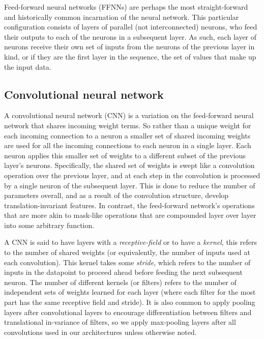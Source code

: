 \documentclass[utf8]{frontiersSCNS} %
\begin{document}
Feed-forward neural networks (FFNNs) are perhaps the most straight-forward and historically common incarnation of the neural network. This particular configuration consists of layers of parallel (not interconnected) neurons, who feed their outputs to each of the neurons in a subsequent layer. As such, each layer of neurons receive their own set of inputs from the neurons of the previous layer in kind, or if they are the first layer in the sequence, the set of values that make up the input data. 

\subsection{Convolutional neural network}

A convolutional neural network (CNN) \cite{GoodfellowTextbook, LeCun2015} is a variation on the feed-forward neural network that shares incoming weight terms. So rather than a unique weight for each incoming connection to a neuron a smaller set of shared incoming weights are used for all the incoming connections to each neuron in a single layer. Each neuron applies this smaller set of weights to a different subset of the previous layer's neurons. Specifically, the shared set of weights is swept like a convolution operation over the previous layer, and at each step in the convolution is processed by a single neuron of the subsequent layer. This is done to reduce the number of parameters overall, and as a result of the convolution structure, develop translation-invariant features. In contrast, the feed-forward network's operations that are more akin to mask-like operations that are compounded layer over layer into some arbitrary function.

A CNN is said to have layers with a {\em receptive-field} or to have a {\em kernel}, this refers to the number of shared weights (or equivalently, the number of inputs used at each convolution). This kernel takes some {\em stride}, which refers to the number of inputs in the datapoint to proceed ahead before feeding the next subsequent neuron. The number of different kernels (or filters) refers to the number of independent sets of weights learned for each layer (where each filter for the most part has the same receptive field and stride). It is also common to apply pooling layers \cite{Krizhevsky:2012:ICD:2999134.2999257} after convolutional layers to encourage differentiation between filters and translational in-variance of filters, so we apply max-pooling layers after all convolutions used in our architectures unless otherwise noted.
\end{document}
